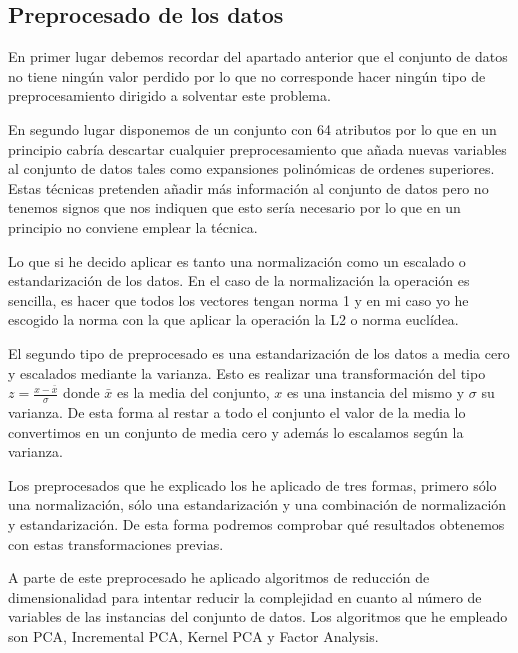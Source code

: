 \documentclass[12pt,a4paper]{article}
\begin{document}
\subsection{Preprocesado de los datos}

En primer lugar debemos recordar del apartado anterior que el conjunto de datos no tiene ningún valor perdido por lo que no corresponde hacer ningún tipo de preprocesamiento dirigido a solventar este problema.

En segundo lugar disponemos de un conjunto con 64 atributos por lo que en un principio cabría descartar cualquier preprocesamiento que añada nuevas variables al conjunto de datos tales como expansiones polinómicas de ordenes superiores. Estas técnicas pretenden añadir más información al conjunto de datos pero no tenemos signos que nos indiquen que esto sería necesario por lo que en un principio no conviene emplear la técnica. 

Lo que si he decido aplicar es tanto una normalización como un escalado o estandarización de los datos. En el caso de la normalización la operación es sencilla, es hacer que todos los vectores tengan norma 1 y en mi caso yo he escogido la norma con la que aplicar la operación la L2 o norma euclídea. 

El segundo tipo de preprocesado es una estandarización de los datos a media cero y escalados mediante la varianza. Esto es realizar una transformación del tipo $z = \frac{x-\bar{x}}{\sigma}$ donde $\bar{x}$ es la media del conjunto, $x$ es una instancia del mismo y $\sigma$ su varianza. De esta forma al restar a todo el conjunto el valor de la media lo convertimos en un conjunto de media cero y además lo escalamos según la varianza.

Los preprocesados que he explicado los he aplicado de tres formas, primero sólo una normalización, sólo una estandarización y una combinación de normalización y estandarización. De esta forma podremos comprobar qué resultados obtenemos con estas transformaciones previas.

A parte de este preprocesado he aplicado algoritmos de reducción de dimensionalidad para intentar reducir la complejidad en cuanto al número de variables de las instancias del conjunto de datos. Los algoritmos que he empleado son PCA, Incremental PCA, Kernel PCA y Factor Analysis. 
\end{document}
